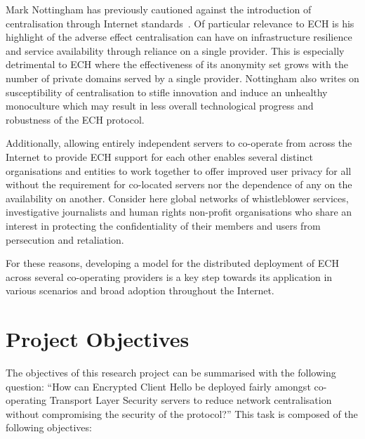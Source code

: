 Mark Nottingham has previously cautioned against the introduction of centralisation through Internet standards~\cite{rfc9518}. Of particular relevance to ECH is his highlight of the adverse effect centralisation can have on infrastructure resilience and service availability through reliance on a single provider. This is especially detrimental to ECH where the effectiveness of its anonymity set grows with the number of private domains served by a single provider. Nottingham also writes on susceptibility of centralisation to stifle innovation and induce an unhealthy monoculture which may result in less overall technological progress and robustness of the ECH protocol.

Additionally, allowing entirely independent servers to co-operate from across the Internet to provide ECH support for each other enables several distinct organisations and entities to work together to offer improved user privacy for all without the requirement for co-located servers nor the dependence of any on the availability on another. Consider here global networks of whistleblower services, investigative journalists and human rights non-profit organisations who share an interest in protecting the confidentiality of their members and users from persecution and retaliation.

For these reasons, developing a model for the distributed deployment of ECH across several co-operating providers is a key step towards its application in various scenarios and broad adoption throughout the Internet.









\section{Project Objectives}

The objectives of this research project can be summarised with the following question: ``How can Encrypted Client Hello be deployed fairly amongst co-operating Transport Layer Security servers to reduce network centralisation without compromising the security of the protocol?'' This task is composed of the following objectives:

